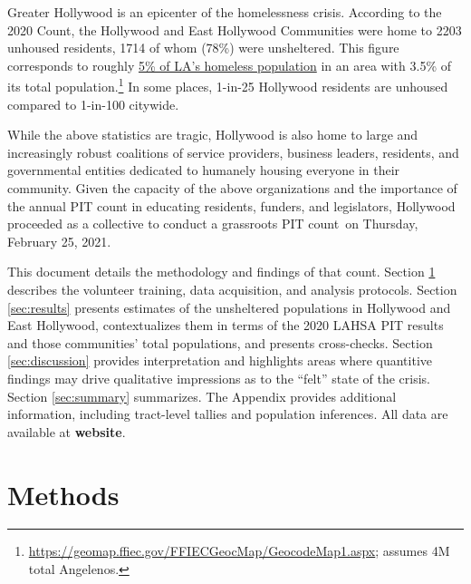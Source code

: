 \documentclass[11pt,twocolumn]{article}
\def\bfr{\bf\color{red}}
\def\Count{count}
\begin{document}
Greater Hollywood is an epicenter of the homelessness crisis. According to the 2020 Count, the 
Hollywood and East Hollywood Communities were home to 2203 unhoused residents, 1714 of whom 
(78\%) were unsheltered. This figure corresponds to roughly 
\href{https://www.lahsa.org/data?id=45-2020-homeless-count-by-community-city}
{5\% of LA's homeless population} in an area with 3.5\% of its total population.\footnote{
\url{https://geomap.ffiec.gov/FFIECGeocMap/GeocodeMap1.aspx}; assumes 4M total Angelenos.} 
In some places, 1-in-25 Hollywood residents are unhoused compared to 1-in-100 citywide.

While the above statistics are tragic, Hollywood is also home to large and increasingly robust
coalitions of service providers, business leaders, residents, and governmental entities dedicated to 
humanely housing everyone in their community. Given the capacity of the above organizations and 
the importance of the annual PIT count in educating residents, funders, and legislators, Hollywood 
proceeded as a collective to conduct a grassroots PIT \Count\ on Thursday, February 25, 2021.

This document details the methodology and findings of that \Count. 
Section \ref{sec:procedure} describes the volunteer training, data acquisition, 
and analysis protocols. Section \ref{sec:results} presents estimates of the unsheltered 
populations in Hollywood and East Hollywood, contextualizes them in terms of the 2020 
LAHSA PIT results and those communities' total populations, and presents cross-checks. 
Section \ref{sec:discussion} provides interpretation and highlights areas where quantitive findings 
may drive qualitative impressions as to the ``felt'' state of the crisis. Section \ref{sec:summary} 
summarizes. The Appendix provides additional information, including tract-level tallies and 
population inferences. All data are available at {\bfr website}.

\section{Methods}
\label{sec:procedure}
%
%
\end{document}
